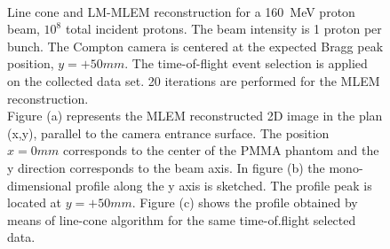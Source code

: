 \begin{figure} [!h]
\\
\caption{Line cone and LM-MLEM reconstruction for a 160~MeV proton beam, $10^{8}$ total incident protons. The beam intensity is 1 proton per bunch. The Compton camera is centered at the expected Bragg peak position, $y=+50 mm$. The time-of-flight event selection is applied on the collected data set. 20 iterations are performed for the MLEM reconstruction.\\
Figure (a) represents the MLEM reconstructed 2D image in the plan (x,y), parallel to the camera entrance surface. The position $x=0 mm$ corresponds to the center of the PMMA phantom and the y direction corresponds to the beam axis.  In figure (b) the mono-dimensional profile along the y axis is sketched. The profile peak is located at $y=+50 mm$. Figure (c) shows the profile obtained by means of line-cone algorithm for the same time-of.flight selected data.}
\label{fig:comparison}
\end{figure}


